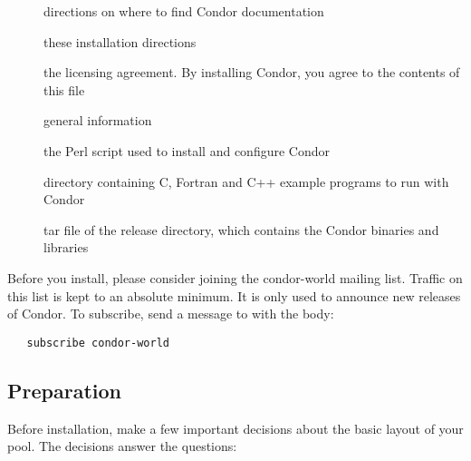 \begin{description}
\item[] directions on where to find Condor documentation
\item[] these installation directions
\item[] the licensing agreement.
                  By installing Condor, you agree to the contents of
		  this file
\item[] general information
\item[] the Perl script used to install and
                  configure Condor
\item[] directory containing C, Fortran and C++ example
		  programs to run with Condor
\item[] tar file of the release directory, which contains
		  the Condor binaries and libraries
\end{description}

Before you install, please consider joining the condor-world mailing
list.
Traffic on this list is kept to an absolute minimum.
It is only used to announce new releases of Condor.
To subscribe, send a message to  with the body:
\begin{verbatim}
   subscribe condor-world 
\end{verbatim}

\subsection{\label{sec:Preparing-to-Install}Preparation} 

Before installation, make a few important
decisions about the basic layout of your pool.
The decisions answer the questions:

